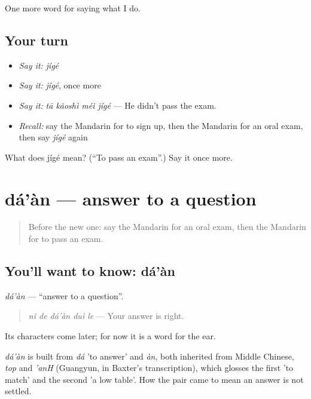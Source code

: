\begin{grammarlens}[title={What you've built}]
One more word for saying what I do.
\end{grammarlens}

\subsection*{Your turn}
\begin{itemize}
\raggedright
  \item \emph{Say it:} \emph{jígé}
  \item \emph{Say it:} \emph{jígé}, once more
  \item \emph{Say it:} \emph{tā kǎoshì méi jígé} — He didn't pass the exam.
  \item \emph{Recall:} say the Mandarin for to sign up, then the Mandarin for an oral exam, then say \emph{jígé} again
\end{itemize}

\begin{tcolorbox}[breakable,colback=teal!4,colframe=teal!35!black,title={Before you move on}]
What does jígé mean? (\textquotedblleft{}To pass an exam\textquotedblright{}.) Say it once more.
\end{tcolorbox}
\section[dá'àn]{dá'àn — answer to a question}

\label{lesson:ZH-C268-daan}



\begin{quote}
Before the new one: say the Mandarin for an oral exam, then the Mandarin for to pass an exam.
\end{quote}

\subsection*{You'll want to know: dá'àn}
\emph{dá'àn} — \textquotedblleft{}answer to a question\textquotedblright{}.

\begin{quote}
\emph{nǐ de dá'àn duì le} — Your answer is right.
\end{quote}

Its characters come later; for now it is a word for the ear.

\begin{cousinweb}
\emph{dá'àn} is built from \emph{dá} 'to answer' and \emph{àn}, both inherited from Middle Chinese, \emph{top} and \emph{'anH} (Guangyun, in Baxter's transcription), which glosses the first 'to match' and the second 'a low table'. How the pair came to mean an answer is not settled.
\end{cousinweb}

